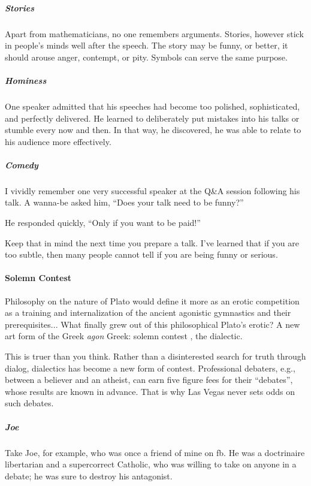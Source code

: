 \subparagraph{Stories}


Apart from mathematicians, no one remembers arguments. Stories, however stick in people's minds well after the speech. The story may be funny, or better, it should arouse anger, contempt, or pity. Symbols can serve the same purpose.

\subparagraph{Hominess}


One speaker admitted that his speeches had become too polished, sophisticated, and perfectly delivered. He learned to deliberately put mistakes into his talks or stumble every now and then. In that way, he discovered, he was able to relate to his audience more effectively.

\subparagraph{Comedy}


I vividly remember one very successful speaker at the Q\&A session following his talk. A wanna-be asked him, ``Does your talk need to be funny?''

He responded quickly, ``Only if you want to be paid!''

Keep that in mind the next time you prepare a talk. I've learned that if you are too subtle, then many people cannot tell if you are being funny or serious.

\paragraph{Solemn Contest}


\begin{quotex}
Philosophy on the nature of Plato would define it more as an erotic competition as a training and internalization of the ancient agonistic gymnastics and their prerequisites... What finally grew out of this philosophical Plato's erotic? A new art form of the Greek \emph{agon} Greek: solemn contest , the dialectic.
\end{quotex}


This is truer than you think. Rather than a disinterested search for truth through dialog, dialectics has become a new form of contest. Professional debaters, e.g., between a believer and an atheist, can earn five figure fees for their ``debates'', whose results are known in advance. That is why Las Vegas never sets odds on such debates.

\subparagraph{Joe}


Take Joe, for example, who was once a friend of mine on fb. He was a doctrinaire libertarian and a supercorrect Catholic, who was willing to take on anyone in a debate; he was sure to destroy his antagonist.

